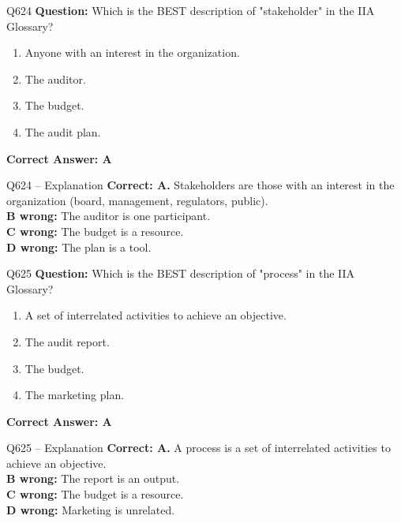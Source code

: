 \documentclass[aspectratio=169,10pt]{beamer}
\begin{document}
	\begin{frame}[t]{Q624}
		\small
		\textbf{Question:} Which is the BEST description of "stakeholder" in the IIA Glossary?
		\begin{enumerate}[label=\Alph*.,itemsep=1pt,topsep=2pt]
			\item Anyone with an interest in the organization.
			\item The auditor.
			\item The budget.
			\item The audit plan.
		\end{enumerate}
		\vspace{4pt}
		\textbf{Correct Answer: A}
	\end{frame}
	
	\begin{frame}[t]{Q624 -- Explanation}
		\small
		\textbf{Correct: A.} Stakeholders are those with an interest in the organization (board, management, regulators, public). \\[4pt]
		\textbf{B wrong:} The auditor is one participant. \\[2pt]
		\textbf{C wrong:} The budget is a resource. \\[2pt]
		\textbf{D wrong:} The plan is a tool.
	\end{frame}
	
	\begin{frame}[t]{Q625}
		\small
		\textbf{Question:} Which is the BEST description of "process" in the IIA Glossary?
		\begin{enumerate}[label=\Alph*.,itemsep=1pt,topsep=2pt]
			\item A set of interrelated activities to achieve an objective.
			\item The audit report.
			\item The budget.
			\item The marketing plan.
		\end{enumerate}
		\vspace{4pt}
		\textbf{Correct Answer: A}
	\end{frame}
	
	\begin{frame}[t]{Q625 -- Explanation}
		\small
		\textbf{Correct: A.} A process is a set of interrelated activities to achieve an objective. \\[4pt]
		\textbf{B wrong:} The report is an output. \\[2pt]
		\textbf{C wrong:} The budget is a resource. \\[2pt]
		\textbf{D wrong:} Marketing is unrelated.
	\end{frame}
	
\end{document}
